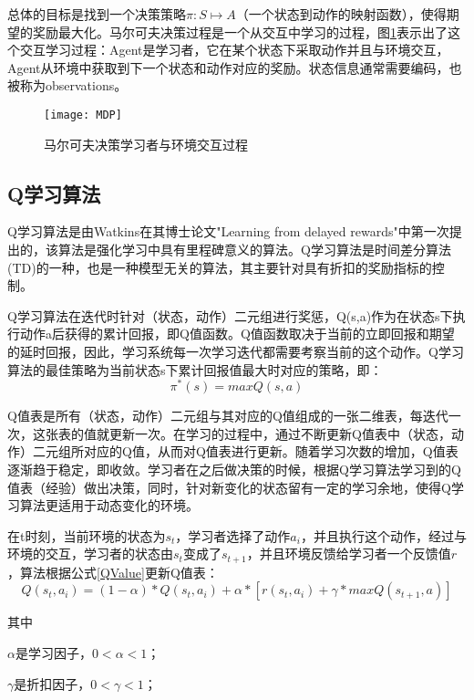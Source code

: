 总体的目标是找到一个决策策略$\pi :S\longmapsto A$（一个状态到动作的映射函数），使得期望的奖励最大化。马尔可夫决策过程是一个从交互中学习的过程，图\ref{Interaction}表示出了这个交互学习过程：Agent是学习者，它在某个状态下采取动作并且与环境交互，Agent从环境中获取到下一个状态和动作对应的奖励。状态信息通常需要编码，也被称为observations。
\begin{figure}[h]
    \centering
    \texttt{[image: MDP]}
    \caption{马尔可夫决策学习者与环境交互过程}
    \label{Interaction}
\end{figure}

\subsection{Q学习算法}
Q学习算法\cite{QLearning2}是由Watkins在其博士论文"Learning from delayed rewards"\cite{QLearning0}中第一次提出的，该算法是强化学习中具有里程碑意义的算法。Q学习算法是时间差分算法(TD)\cite{QLearning1}的一种，也是一种模型无关的算法，其主要针对具有折扣的奖励指标的控制。

Q学习算法在迭代时针对（状态，动作）二元组进行奖惩，Q(s,a)作为在状态s下执行动作a后获得的累计回报，即Q值函数。Q值函数取决于当前的立即回报和期望的延时回报，因此，学习系统每一次学习迭代都需要考察当前的这个动作。Q学习算法的最佳策略为当前状态s下累计回报值最大时对应的策略，即：
\begin{equation}
    \pi^*(s) = max Q(s,a)
\end{equation}

Q值表是所有（状态，动作）二元组与其对应的Q值组成的一张二维表，每迭代一次，这张表的值就更新一次。在学习的过程中，通过不断更新Q值表中（状态，动作）二元组所对应的Q值，从而对Q值表进行更新。随着学习次数的增加，Q值表逐渐趋于稳定，即收敛。学习者在之后做决策的时候，根据Q学习算法学习到的Q值表（经验）做出决策，同时，针对新变化的状态留有一定的学习余地，使得Q学习算法更适用于动态变化的环境。

在t时刻，当前环境的状态为$s_t$，学习者选择了动作$a_i$，并且执行这个动作，经过与环境的交互，学习者的状态由$s_t$变成了$s_{t+1}$，并且环境反馈给学习者一个反馈值$r$，算法根据公式\ref{QValue}\cite{RLIntroduction}更新Q值表：
\begin{equation}
    \label{QValue}
    Q(s_t,a_i)=(1-\alpha)*Q(s_t,a_i)+\alpha *[r(s_t,a_i)+\gamma *maxQ(s_{t+1},a)]
\end{equation}

其中

$\alpha$是学习因子，$0<\alpha <1$；

$\gamma$是折扣因子，$0<\gamma <1$；

